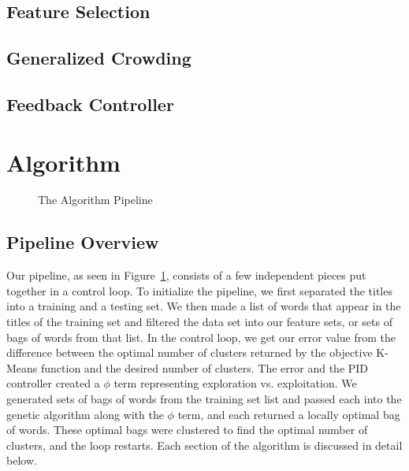 \documentclass{sig-alternate}
\begin{document}
\subsection{Feature Selection}
\cite{feature:feedback}

\subsection{Generalized Crowding}

\subsection{Feedback Controller}

\section{Algorithm}
\begin{figure}[t]
\centering
{}
\caption{The Algorithm Pipeline}
\label{fig:pipeline}
\end{figure}
\subsection{Pipeline Overview}
Our pipeline, as seen in Figure~\ref{fig:pipeline}, consists of a few independent pieces put together in a control loop. To initialize the pipeline, we first separated the titles into a training and a testing set. We then made a list of words that appear in the titles of the training set and filtered the data set into our feature sets, or sets of bags of words from that list. In the control loop, we get our error value from the difference between the optimal number of clusters returned by the objective K-Means function and the desired number of clusters. The error and the PID controller created a $\phi$ term representing exploration vs. exploitation. We generated sets of bags of words from the training set list and passed each into the genetic algorithm along with the $\phi$ term, and each returned a locally optimal bag of words. These optimal bags were clustered to find the optimal number of clusters, and the loop restarts. Each section of the algorithm is discussed in detail below.
\end{document}
